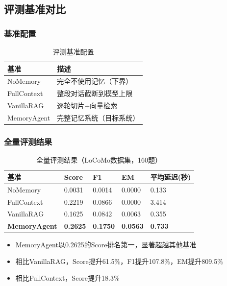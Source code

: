 \documentclass[11pt]{article}
\begin{document}
\subsection{评测基准对比}

\subsubsection{基准配置}

\begin{table}[H]
    \centering
    \begin{tabular}{|l|l|}
        \hline
        基准 & 描述 \\
        \hline
        NoMemory & 完全不使用记忆（下界） \\
        \hline
        FullContext & 整段对话截断到模型上限 \\
        \hline
        VanillaRAG & 逐轮切片+向量检索 \\
        \hline
        MemoryAgent & 完整记忆系统（目标系统） \\
        \hline
    \end{tabular}
    \caption{评测基准配置}
\end{table}

\subsubsection{全量评测结果}

\begin{table}[H]
    \centering
    \begin{tabular}{|l|l|l|l|l|}
        \hline
        基准 & Score & F1 & EM & 平均延迟(秒) \\
        \hline
        NoMemory & 0.0031 & 0.0014 & 0.0000 & 0.133 \\
        \hline
        FullContext & 0.2219 & 0.0866 & 0.0000 & 3.414 \\
        \hline
        VanillaRAG & 0.1625 & 0.0842 & 0.0063 & 0.355 \\
        \hline
        \textbf{MemoryAgent} & \textbf{0.2625} & \textbf{0.1750} & \textbf{0.0563} & \textbf{0.733} \\
        \hline
    \end{tabular}
    \caption{全量评测结果（LoCoMo数据集，160题）}
\end{table}

\begin{itemize}
    \item MemoryAgent以0.2625的Score排名第一，显著超越其他基准
    \item 相比VanillaRAG，Score提升61.5\%，F1提升107.8\%，EM提升809.5\%
    \item 相比FullContext，Score提升18.3\%
\end{itemize}
\end{document}
